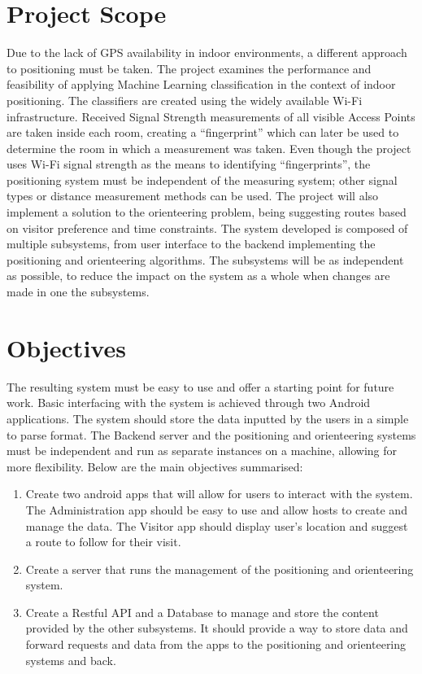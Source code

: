 \documentclass[12pt]{informatics-report}
\begin{document}
\section{Project Scope}
Due to the lack of GPS availability in indoor environments, a different approach to positioning must be taken. The project examines the performance and feasibility of applying Machine Learning classification in the context of indoor positioning. The classifiers are created using the widely available Wi-Fi infrastructure. Received Signal Strength measurements of all visible Access Points are taken inside each room, creating a “fingerprint” which can later be used to determine the room in which a measurement was taken. Even though the project uses Wi-Fi signal strength as the means to identifying “fingerprints”, the positioning system must be independent of the measuring system; other signal types or distance measurement methods can be used. The project will also implement a solution to the orienteering problem, being suggesting routes based on visitor preference and time constraints. The system developed is composed of multiple subsystems, from user interface to the backend implementing the positioning and orienteering algorithms. The subsystems will be as independent as possible, to reduce the impact on the system as a whole when changes are made in one the subsystems.

\section{Objectives}
The resulting system must be easy to use and offer a starting point for future work. Basic interfacing with the system is achieved through two Android applications. The system should store the data inputted by the users in a simple to parse format. The Backend server and the positioning and orienteering systems must be independent and run as separate instances on a machine, allowing for more flexibility.
Below are the main objectives summarised:
\begin{enumerate}
\item Create two android apps that will allow for users to interact with the system. The Administration app should be easy to use and allow hosts to create and manage the data. The Visitor app should display user’s location and suggest a route to follow for their visit.
\item Create a server that runs the management of the positioning and orienteering system.
\item Create a Restful API and a Database to manage and store the content provided by the other subsystems. It should provide a way to store data and forward requests and data from the apps to the positioning and orienteering systems and back.
\end{enumerate}
\end{document}

